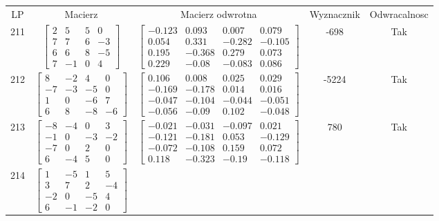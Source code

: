 \documentclass[a4paper,12pt]{article}
\begin{document}
\bgroup {} \vspace{0.2in} \begin{tabular}{c c c c c}
LP & Macierz & Macierz odwrotna & Wyznacznik & Odwracalnosc\\
211
&
$\begin{bmatrix} 2 & 5 & 5 & 0 \\ 7 & 7 & 6 & -3 \\ 6 & 6 & 8 & -5 \\ 7 & -1 & 0 & 4 \end{bmatrix}$
&
$\begin{bmatrix} -0.123 & 0.093 & 0.007 & 0.079 \\ 0.054 & 0.331 & -0.282 & -0.105 \\ 0.195 & -0.368 & 0.279 & 0.073 \\ 0.229 & -0.08 & -0.083 & 0.086 \end{bmatrix}$
&
-698
&
Tak
\\
212
&
$\begin{bmatrix} 8 & -2 & 4 & 0 \\ -7 & -3 & -5 & 0 \\ 1 & 0 & -6 & 7 \\ 6 & 8 & -8 & -6 \end{bmatrix}$
&
$\begin{bmatrix} 0.106 & 0.008 & 0.025 & 0.029 \\ -0.169 & -0.178 & 0.014 & 0.016 \\ -0.047 & -0.104 & -0.044 & -0.051 \\ -0.056 & -0.09 & 0.102 & -0.048 \end{bmatrix}$
&
-5224
&
Tak
\\
213
&
$\begin{bmatrix} -8 & -4 & 0 & 3 \\ -1 & 0 & -3 & -2 \\ -7 & 0 & 2 & 0 \\ 6 & -4 & 5 & 0 \end{bmatrix}$
&
$\begin{bmatrix} -0.021 & -0.031 & -0.097 & 0.021 \\ -0.121 & -0.181 & 0.053 & -0.129 \\ -0.072 & -0.108 & 0.159 & 0.072 \\ 0.118 & -0.323 & -0.19 & -0.118 \end{bmatrix}$
&
780
&
Tak
\\
214
&
$\begin{bmatrix} 1 & -5 & 1 & 5 \\ 3 & 7 & 2 & -4 \\ -2 & 0 & -5 & 4 \\ 6 & -1 & -2 & 0 \end{bmatrix}$

\end{tabular}
\end{document}
